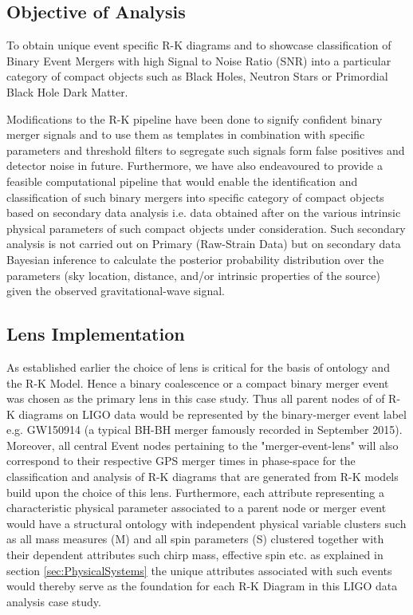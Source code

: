     \subsection{Objective of Analysis}

    To obtain unique event specific R-K diagrams and to showcase classification of Binary Event Mergers with high Signal to Noise Ratio (SNR) into a particular category of compact objects such as Black Holes, Neutron Stars or Primordial Black Hole Dark Matter.

    Modifications to the R-K pipeline have been done to signify confident binary merger signals and to use them as templates in combination with specific parameters and threshold filters to segregate such signals form false positives and detector noise in future. Furthermore, we have also endeavoured to provide a feasible computational pipeline that would enable the identification and classification of such binary mergers into specific category of compact objects based on secondary data analysis i.e. data obtained after on the various intrinsic physical parameters of such compact objects under consideration. Such secondary analysis is not carried out on Primary (Raw-Strain Data) but on secondary data Bayesian inference to calculate the posterior probability distribution over the parameters (sky location, distance, and/or intrinsic properties of the source) given the observed gravitational-wave signal.

    \subsection{Lens Implementation}

    As established earlier the choice of lens is critical for the basis of ontology and the R-K Model. Hence a binary coalescence or a compact binary merger event was chosen as the primary lens in this case study. Thus all parent nodes of of R-K diagrams on LIGO data would be represented by the binary-merger event label e.g. GW150914 (a typical BH-BH merger famously recorded in September 2015). Moreover, all central Event nodes pertaining to the "merger-event-lens" will also correspond to their respective GPS merger times in phase-space for the classification and analysis of R-K diagrams that are generated from R-K models build upon the choice of this lens. Furthermore, each attribute representing a characteristic physical parameter associated to a parent node or merger event would have a structural ontology with independent physical variable clusters such as all mass measures (M) and all spin parameters (S) clustered together with their dependent attributes such chirp mass, effective spin etc. as explained in section \ref{sec:PhysicalSystems}
    the unique attributes associated with such events would thereby serve as the  foundation for each R-K Diagram in this LIGO data analysis case study.

